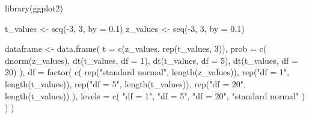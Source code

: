 \documentclass[
  b5paper,
  DIV=11,
  numbers=noendperiod]{scrreprt}
\newenvironment{Shaded}{\begin{snugshade}}{\end{snugshade}}
\newcommand{\AttributeTok}[1]{\textcolor[rgb]{0.40,0.45,0.13}{#1}}
\newcommand{\DecValTok}[1]{\textcolor[rgb]{0.68,0.00,0.00}{#1}}
\newcommand{\FloatTok}[1]{\textcolor[rgb]{0.68,0.00,0.00}{#1}}
\newcommand{\FunctionTok}[1]{\textcolor[rgb]{0.28,0.35,0.67}{#1}}
\newcommand{\NormalTok}[1]{\textcolor[rgb]{0.00,0.23,0.31}{#1}}
\newcommand{\OtherTok}[1]{\textcolor[rgb]{0.00,0.23,0.31}{#1}}
\newcommand{\SpecialCharTok}[1]{\textcolor[rgb]{0.37,0.37,0.37}{#1}}
\newcommand{\StringTok}[1]{\textcolor[rgb]{0.13,0.47,0.30}{#1}}
\theoremstyle{definition}
\theoremstyle{remark}
\begin{document}
\begin{Shaded}
\begin{Highlighting}[]
\FunctionTok{library}\NormalTok{(ggplot2)}

\NormalTok{t\_values }\OtherTok{\textless{}{-}} \FunctionTok{seq}\NormalTok{(}\SpecialCharTok{{-}}\DecValTok{3}\NormalTok{, }\DecValTok{3}\NormalTok{, }\AttributeTok{by =} \FloatTok{0.1}\NormalTok{)}
\NormalTok{z\_values }\OtherTok{\textless{}{-}} \FunctionTok{seq}\NormalTok{(}\SpecialCharTok{{-}}\DecValTok{3}\NormalTok{, }\DecValTok{3}\NormalTok{, }\AttributeTok{by =} \FloatTok{0.1}\NormalTok{)}

\NormalTok{dataframe }\OtherTok{\textless{}{-}} \FunctionTok{data.frame}\NormalTok{(}
  \AttributeTok{t =} \FunctionTok{c}\NormalTok{(z\_values, }\FunctionTok{rep}\NormalTok{(t\_values, }\DecValTok{3}\NormalTok{)),}
  \AttributeTok{prob =} \FunctionTok{c}\NormalTok{(}
    \FunctionTok{dnorm}\NormalTok{(z\_values),}
    \FunctionTok{dt}\NormalTok{(t\_values, }\AttributeTok{df =} \DecValTok{1}\NormalTok{),}
    \FunctionTok{dt}\NormalTok{(t\_values, }\AttributeTok{df =} \DecValTok{5}\NormalTok{),}
    \FunctionTok{dt}\NormalTok{(t\_values, }\AttributeTok{df =} \DecValTok{20}\NormalTok{)}
\NormalTok{  ),}
  \AttributeTok{df =} \FunctionTok{factor}\NormalTok{(}
    \FunctionTok{c}\NormalTok{(}
      \FunctionTok{rep}\NormalTok{(}\StringTok{"standard normal"}\NormalTok{, }\FunctionTok{length}\NormalTok{(z\_values)),}
      \FunctionTok{rep}\NormalTok{(}\StringTok{"df = 1"}\NormalTok{, }\FunctionTok{length}\NormalTok{(t\_values)),}
      \FunctionTok{rep}\NormalTok{(}\StringTok{"df = 5"}\NormalTok{, }\FunctionTok{length}\NormalTok{(t\_values)),}
      \FunctionTok{rep}\NormalTok{(}\StringTok{"df = 20"}\NormalTok{, }\FunctionTok{length}\NormalTok{(t\_values))}
\NormalTok{      ),}
    \AttributeTok{levels =} \FunctionTok{c}\NormalTok{(}
      \StringTok{"df = 1"}\NormalTok{, }\StringTok{"df = 5"}\NormalTok{, }\StringTok{"df = 20"}\NormalTok{, }\StringTok{"standard normal"}
\NormalTok{      )}
\NormalTok{    ) }
\NormalTok{  )}


\end{Highlighting}
\end{Shaded}
\end{document}
